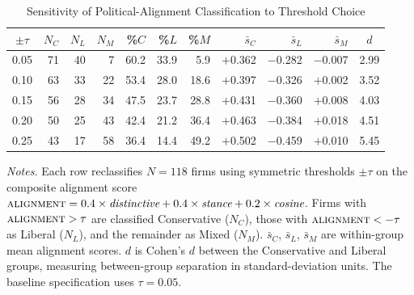 \begin{table}[htbp]
\centering
\caption{Sensitivity of Political-Alignment Classification to Threshold Choice}
\label{tab:threshold_sensitivity}
\begin{tabular}{c rrr rrr rrr c}
\toprule
$\pm\tau$ & $N_C$ & $N_L$ & $N_M$ & \%$C$ & \%$L$ & \%$M$ & $\bar{s}_C$ & $\bar{s}_L$ & $\bar{s}_M$ & $d$ \\
\midrule
0.05 & 71 & 40 &  7 & 60.2 & 33.9 &  5.9 & $+$0.362 & $-$0.282 & $-$0.007 & 2.99 \\
0.10 & 63 & 33 & 22 & 53.4 & 28.0 & 18.6 & $+$0.397 & $-$0.326 & $+$0.002 & 3.52 \\
0.15 & 56 & 28 & 34 & 47.5 & 23.7 & 28.8 & $+$0.431 & $-$0.360 & $+$0.008 & 4.03 \\
0.20 & 50 & 25 & 43 & 42.4 & 21.2 & 36.4 & $+$0.463 & $-$0.384 & $+$0.018 & 4.51 \\
0.25 & 43 & 17 & 58 & 36.4 & 14.4 & 49.2 & $+$0.502 & $-$0.459 & $+$0.010 & 5.45 \\
\bottomrule
\end{tabular}
\begin{tablenotes}[flushleft]\small
\item \textit{Notes.} Each row reclassifies $N=118$ firms using symmetric
thresholds $\pm\tau$ on the composite alignment score
$\textsc{alignment} = 0.4 \times \textit{distinctive} + 0.4 \times
\textit{stance} + 0.2 \times \textit{cosine}$.  Firms with
$\textsc{alignment} > \tau$ are classified Conservative ($N_C$),
those with $\textsc{alignment} < -\tau$ as Liberal ($N_L$), and
the remainder as Mixed ($N_M$).  $\bar{s}_C$, $\bar{s}_L$,
$\bar{s}_M$ are within-group mean alignment scores.  $d$ is
Cohen's $d$ between the Conservative and Liberal groups,
measuring between-group separation in standard-deviation units.
The baseline specification uses $\tau = 0.05$.
\end{tablenotes}
\end{table}
